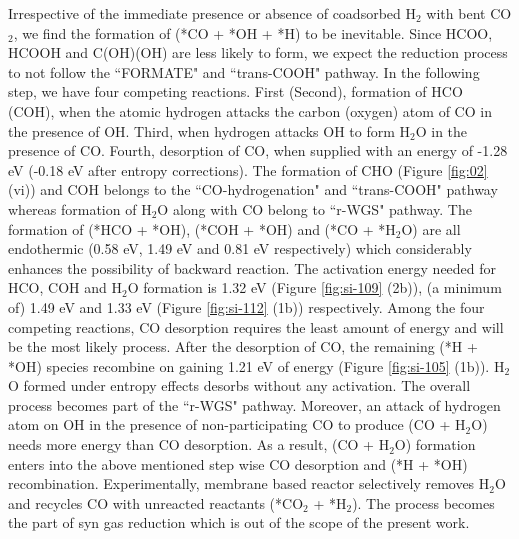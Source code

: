 Irrespective of the immediate presence or absence of coadsorbed H$_2$ with bent CO$_2$, we find the formation of (*CO + *OH + *H) to be inevitable. Since HCOO, HCOOH and C(OH)(OH) are less likely to form, we expect the reduction process to not follow the ``FORMATE" and ``trans-COOH" pathway. In the following step, we have four competing reactions. First (Second), formation of HCO (COH), when the atomic hydrogen attacks the carbon (oxygen) atom of CO in the presence of OH. Third, when hydrogen attacks OH to form H$_2$O in the presence of CO. Fourth, desorption of CO, when supplied with an energy of -1.28 eV (-0.18 eV after entropy corrections). The formation of CHO (Figure \ref{fig:02} (vi)) and COH belongs to the ``CO-hydrogenation" and ``trans-COOH" pathway whereas formation of H$_2$O along with CO belong to ``r-WGS" pathway. The formation of (*HCO + *OH), (*COH + *OH) and (*CO + *H$_2$O) are all endothermic (0.58 eV, 1.49 eV and 0.81 eV respectively) which considerably enhances the possibility of backward reaction. The activation energy needed for HCO, COH and H$_2$O formation is 1.32 eV (Figure \ref{fig:si-109} (2b)), (a minimum of) 1.49 eV and 1.33 eV (Figure \ref{fig:si-112} (1b)) respectively. Among the four competing reactions, CO desorption requires the least amount of energy and will be the most likely process. After the desorption of CO, the remaining (*H + *OH) species recombine on gaining 1.21 eV of energy (Figure \ref{fig:si-105} (1b)). H$_2$O formed under entropy effects desorbs without any activation. The overall process becomes part of the ``r-WGS" pathway. Moreover, an attack of hydrogen atom on OH in the presence of non-participating CO to produce (CO + H$_2$O) needs more energy than CO desorption. As a result, (CO + H$_2$O) formation enters into the above mentioned step wise CO desorption and (*H + *OH) recombination. Experimentally\cite{zhong2020state,riaz2013review}, membrane based reactor selectively removes H$_2$O and recycles CO with unreacted reactants (*CO$_2$ + *H$_2$). The process becomes the part of syn gas reduction which is out of the scope of the present work. 

